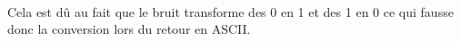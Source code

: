 \paragraph{} Cela est dû au fait que le bruit transforme des 0 en 1 et des 1 en 0 ce qui fausse donc la conversion lors du retour en ASCII.
 
 
 
 
 
 














































 
 
 
 
 
 
 
 
 



